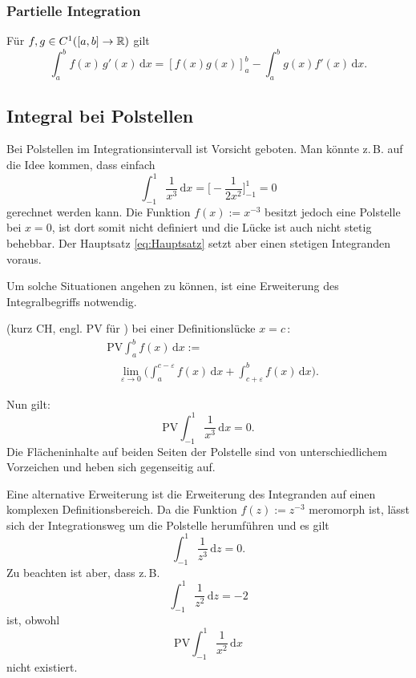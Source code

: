 \subsubsection{Partielle Integration}
Für $f,g\in C^1([a,b]\to\mathbb R)$ gilt
\begin{equation}
\int_a^b f(x)\,g'(x)\,\mathrm dx = [f(x)g(x)]_a^b
- \int_a^b g(x)f'(x)\,\mathrm dx.
\end{equation}

\subsection{Integral bei Polstellen}
Bei Polstellen im Integrationsintervall ist Vorsicht geboten.
Man könnte z.\,B. auf die Idee kommen, dass einfach%
\begin{equation}
\int_{-1}^1 \frac{1}{x^3}\,\mathrm dx
= \Big[-\frac{1}{2x^2}\Big]_{-1}^1 = 0
\end{equation}
gerechnet werden kann. Die Funktion $f(x):=x^{-3}$ besitzt jedoch eine
Polstelle bei $x=0$, ist dort somit nicht definiert und die Lücke
ist auch nicht stetig behebbar. Der Hauptsatz \eqref{eq:Hauptsatz}
setzt aber einen stetigen Integranden voraus. 

Um solche Situationen angehen zu können, ist eine Erweiterung
des Integralbegriffs notwendig.

\begin{definition}\mbox{}\newline
{}
(kurz CH, engl. PV für )
bei einer Definitionslücke $x=c$\,:
\begin{equation}
\begin{split}
&\mathrm{PV}\int_a^b f(x)\,\mathrm dx :=\\
&\quad\lim_{\varepsilon\to 0}\bigg(\int_a^{c-\varepsilon} f(x)\,\mathrm dx
+\int_{c+\varepsilon}^b f(x)\,\mathrm dx\bigg).
\end{split}
\end{equation}
\end{definition}
Nun gilt:
\begin{equation}
\mathrm{PV}\int_{-1}^1 \frac{1}{x^3}\,\mathrm dx = 0.
\end{equation}
Die Flächeninhalte auf beiden Seiten der Polstelle sind
von unterschiedlichem Vorzeichen und heben sich gegenseitig auf.

Eine alternative Erweiterung
ist die Erweiterung des Integranden auf einen komplexen
Definitionsbereich. Da die Funktion $f(z):=z^{-3}$ meromorph
ist, lässt sich der Integrationsweg um die Polstelle herumführen
und es gilt%
\begin{equation}
\int_{-1}^1 \frac{1}{z^3}\,\mathrm dz = 0.
\end{equation}
Zu beachten ist aber, dass z.\,B.
\begin{equation}
\int_{-1}^1 \frac{1}{z^2}\,\mathrm dz = -2
\end{equation}
ist, obwohl
\begin{equation}
\mathrm{PV}\int_{-1}^1 \frac{1}{x^2}\,\mathrm dx
\end{equation}
nicht existiert.

